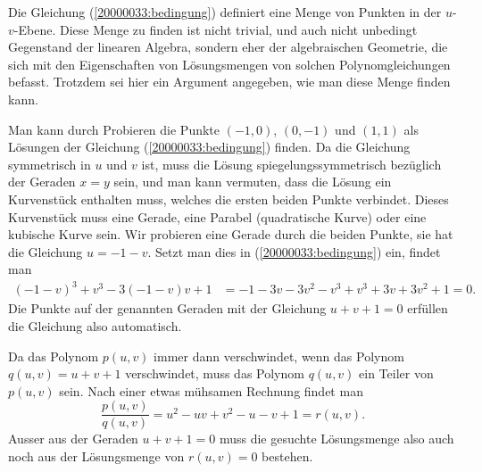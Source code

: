 \begin{diskussion}
Die Gleichung (\ref{20000033:bedingung}) definiert eine Menge von Punkten
in der $u$-$v$-Ebene.
Diese Menge zu finden ist nicht trivial, und auch nicht unbedingt Gegenstand
der linearen Algebra, sondern eher der algebraischen Geometrie, die sich
mit den Eigenschaften von Lösungsmengen von solchen Polynomgleichungen befasst.
Trotzdem sei hier ein Argument angegeben, wie man diese Menge finden kann.

Man kann durch Probieren die Punkte $(-1,0)$, $(0,-1)$ und $(1,1)$ als Lösungen
der Gleichung (\ref{20000033:bedingung}) finden.
Da die Gleichung symmetrisch in $u$ und $v$ ist, muss die Lösung
spiegelungssymmetrisch bezüglich der Geraden $x=y$ sein, und man kann
vermuten, dass die Lösung ein Kurvenstück enthalten muss, welches
die ersten beiden Punkte verbindet.
Dieses Kurvenstück muss eine Gerade, eine Parabel (quadratische Kurve) oder
eine kubische Kurve sein. 
Wir probieren eine Gerade durch die beiden Punkte, sie hat die Gleichung $u=-1-v$.
Setzt man dies in (\ref{20000033:bedingung}) ein, findet man
\begin{align*}
(-1-v)^3+v^3-3(-1-v)v+1
&=
-1-3v-3v^2-v^3+v^3+3v+3v^2+1=0.
\end{align*}
Die Punkte auf der genannten Geraden mit der Gleichung
$u+v+1=0$
erfüllen die Gleichung also automatisch.

Da das Polynom $p(u,v)$ immer dann verschwindet, wenn das Polynom $q(u,v)=u+v+1$
verschwindet, muss das Polynom $q(u,v)$ ein Teiler von $p(u,v)$ sein.
Nach einer etwas mühsamen Rechnung findet man 
\[
\frac{p(u,v)}{q(u,v)}= u^2 - uv + v^2-u-v+1=r(u,v).
\]
Ausser aus der Geraden $u+v+1=0$ muss die gesuchte Lösungsmenge also auch noch aus
der Lösungsmenge von $r(u,v)=0$ bestehen.


\end{diskussion}
